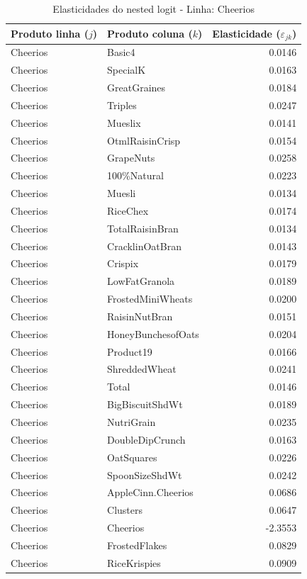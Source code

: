 \begingroup
\begin{table}[H]
\centering
\caption{Elasticidades do nested logit - Linha: Cheerios}
\label{tab:elas-nested-cheerios}
\small
\begin{tabular}{llr}
\toprule
Produto linha ($j$) & Produto coluna ($k$) & Elasticidade ($\varepsilon_{jk}$) \\
\midrule
Cheerios & Basic4 & 0.0146 \\
Cheerios & SpecialK & 0.0163 \\
Cheerios & GreatGraines & 0.0184 \\
Cheerios & Triples & 0.0247 \\
Cheerios & Mueslix & 0.0141 \\
Cheerios & OtmlRaisinCrisp & 0.0154 \\
Cheerios & GrapeNuts & 0.0258 \\
Cheerios & 100\%Natural & 0.0223 \\
Cheerios & Muesli & 0.0134 \\
Cheerios & RiceChex & 0.0174 \\
Cheerios & TotalRaisinBran & 0.0134 \\
Cheerios & CracklinOatBran & 0.0143 \\
Cheerios & Crispix & 0.0179 \\
Cheerios & LowFatGranola & 0.0189 \\
Cheerios & FrostedMiniWheats & 0.0200 \\
Cheerios & RaisinNutBran & 0.0151 \\
Cheerios & HoneyBunchesofOats & 0.0204 \\
Cheerios & Product19 & 0.0166 \\
Cheerios & ShreddedWheat & 0.0241 \\
Cheerios & Total & 0.0146 \\
Cheerios & BigBiscuitShdWt & 0.0189 \\
Cheerios & NutriGrain & 0.0235 \\
Cheerios & DoubleDipCrunch & 0.0163 \\
Cheerios & OatSquares & 0.0226 \\
Cheerios & SpoonSizeShdWt & 0.0242 \\
Cheerios & AppleCinn.Cheerios & 0.0686 \\
Cheerios & Clusters & 0.0647 \\
Cheerios & Cheerios & -2.3553 \\
Cheerios & FrostedFlakes & 0.0829 \\
Cheerios & RiceKrispies & 0.0909 \\

\end{tabular}
\end{table}
